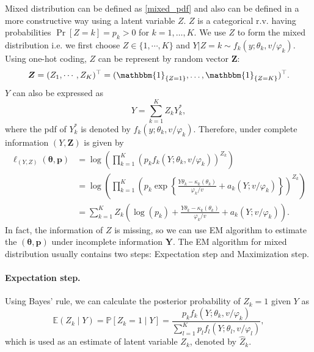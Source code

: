 \documentclass[11pt]{article}
\numberwithin{equation}{section}
\begin{document}
Mixed distribution can be defined as \eqref{mixed_pdf} and also can be defined in a more constructive way using a latent variable $Z$. $Z$ is a categorical r.v. having probabilities $\Pr[Z=k]=p_k >0$ for $k=1,\ldots,K$. We use $Z$ to form the mixed distribution i.e. we first choose $Z \in \{1, \cdots, K\}$ and $Y|Z=k \sim  f_{k}\left(y ; \theta_{k}, v / \varphi_{k}\right)$. Using one-hot coding, $Z$ can be represent by random vector $\boldsymbol{Z}$:
\begin{equation}
	\boldsymbol{Z} = (Z_1,\cdots, Z_K)^{\top}=(\mathbbm{1}_{\{Z=1\}},\ldots,\mathbbm{1}_{\{Z=K\}})^{\top}.
\end{equation}
$Y$ can also be expressed as 
\begin{equation}
	Y = \sum_{k=1}^K Z_k Y_k^{*},
\end{equation}
where the pdf of $Y_k^{*}$ is denoted by $f_{k}\left(y ; \theta_{k}, v / \varphi_{k}\right)$. Therefore, under complete information $(Y,\boldsymbol{Z})$ is given by
\begin{equation}
	\begin{aligned}
		\ell_{(Y, Z)}(\boldsymbol{\theta}, \boldsymbol{p}) &=\log \left(\prod_{k=1}^{K}\left(p_{k} f_{k}\left(Y ; \theta_{k}, v / \varphi_{k}\right)\right)^{Z_{k}}\right) \\
		&=\log \left(\prod_{k=1}^{K}\left(p_{k} \exp \left\{\frac{Y \theta_{k}-\kappa_{k}\left(\theta_{k}\right)}{\varphi_{k} / v}+a_{k}\left(Y ; v / \varphi_{k}\right)\right\}\right)^{Z_{k}}\right) \\
		&=\sum_{k=1}^{K} Z_{k}\left(\log \left(p_{k}\right)+\frac{Y \theta_{k}-\kappa_{k}\left(\theta_{k}\right)}{\varphi_{k} / v}+a_{k}\left(Y ; v / \varphi_{k}\right)\right).
	\end{aligned}
\end{equation}
In fact, the information of $Z$ is missing, so we can use EM algorithm to estimate the $(\boldsymbol{\theta},\boldsymbol{p})$ under incomplete information $\boldsymbol{Y}$. The EM algorithm for mixed distribution usually contains two steps: Expectation step and Maximization step. 

\paragraph{Expectation step.} Using Bayes' rule, we can calculate the posterior probability of $Z_k =1$ given $Y$ as 
\begin{equation*}
	\mathbb{E}\left(Z_{k} \mid Y\right)=\mathbb{P}\left[Z_{k}=1 \mid Y\right]=\frac{p_{k} f_{k}\left(Y ; \theta_{k}, v / \varphi_{k}\right)}{\sum_{l=1}^{K} p_{l} f_{l}\left(Y ; \theta_{l}, v / \varphi_{l}\right)},
\end{equation*}
which is used as an estimate of latent variable $Z_k$, denoted by $\hat{Z}_k$. 
\end{document}
